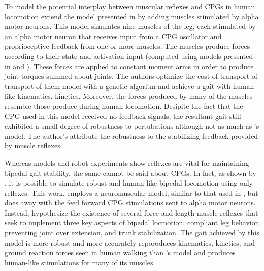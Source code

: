 To model the potential interplay between muscular reflexes and CPGs in human
locomotion \citet{ogihara2001generation} extend the model presented in
\citet{taga1991self} by adding muscles stimulated by alpha motor neurons. This
model simulates nine muscles of the leg, each stimulated by an alpha motor
neuron that receives input from a CPG oscillator and proprioceptive feedback
from one or more muscles. The muscles produce forces according to their state
and activation input (computed using models presented in
\citet{pierrynowski1985physiological} and \citet{davy1987dynamic}). These forces
are applied to constant moment arms in order to produce joint torques summed
about joints. The authors optimize the cost of transport of transport of them
model with a genetic algoritm and achieve a gait with human-like kinematics,
kinetics. Moreover, the forces produced by many of the muscles resemble those
produce during human locomotion. Desipite the fact that the CPG used in this
model received no feedback signals, the resultant gait still exhibited a small
degree of robustness to pertubations although not as much as
\citeauthor{taga1991self}'s model. The author's attribute the robustness to the
stabilizing feedback provided by muscle reflexes. 

Whereas models and robot experiments show reflexes are vital for maintaining
bipedal gait stability, the same cannot be said about CPGs. In fact, as shown by
\citet{geyer2010muscle}, it is possible to simulate robust and human-like
bipedal locomotion using only reflexes. This work, employs a neuromuscular
model, similar to that used in \citet{ogihara2001generation}, but does away with
the feed forward CPG stimulations sent to alpha motor neurons. Instead,
\citeauthor{geyer2010muscle} hypothesize the existence of several force and
length muscle reflexes that seek to implement three key aspects of bipedal
locmotion: compliant leg behavior, preventing joint over extension, and trunk
stabilization. The gait achieved by this model is more robust and more
accurately reporoduces kinematics, kinetics, and ground reaction forces seen in
human walking than \citeauthor{ogihara2001generation}'s model and produces
human-like stimulations for many of its muscles.

